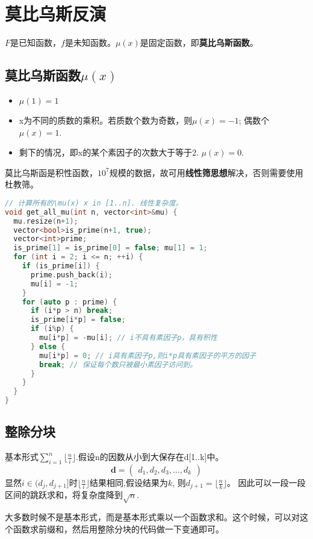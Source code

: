 \section{莫比乌斯反演}
		\par $F$是已知函数，$f$是未知函数。$\mu(x)$是固定函数，即\textbf{莫比乌斯函数}。
		\subsection{莫比乌斯函数$\mu(x)$}
			\begin{itemize}
				\item $\mu(1)=1$
				\item x为不同的质数的乘积。若质数个数为奇数，则$\mu(x)=-1$; 偶数个$\mu(x)=1$.
				\item 剩下的情况，即x的某个素因子的次数大于等于2. $\mu(x)=0$.
			\end{itemize}
			\par 莫比乌斯函是积性函数，$10^7$规模的数据，故可用\textbf{线性筛思想}解决，否则需要使用杜教筛。
			\begin{lstlisting}[language={c++}]
// 计算所有的\mu(x) x in [1..n]. 线性复杂度。
void get_all_mu(int n, vector<int>&mu) {
  mu.resize(n+1);
  vector<bool>is_prime(n+1, true);
  vector<int>prime;
  is_prime[1] = is_prime[0] = false; mu[1] = 1;
  for (int i = 2; i <= n; ++i) {
    if (is_prime[i]) {
      prime.push_back(i);
      mu[i] = -1;
    }
    for (auto p : prime) {
      if (i*p > n) break;
      is_prime[i*p] = false;
      if (i%p) {
        mu[i*p] = -mu[i]; // i不具有素因子p，具有积性
      } else {
        mu[i*p] = 0; // i具有素因子p,则i*p具有素因子的平方的因子
        break; // 保证每个数只被最小素因子访问到。
      }
    }
  }
}
			\end{lstlisting}

		\subsection{整除分块}
		基本形式$\sum\limits_{i=1}^{n} \lfloor \frac{n}{i} \rfloor$.假设n的因数从小到大保存在d[1..k]中。
		\begin{equation}
			\mathbf{d} = 
			\left(
				\begin{array}{ccc}
					d_1, d_2,  d_3,  \ldots,  d_k
				\end{array}	
			\right)
		\end{equation}
		显然$i \in (d_j,d_{j+1}]$时$\lfloor \frac{n}{i} \rfloor$结果相同,假设结果为$k$, 则$d_{j+1}=\lfloor \frac{n}{k} \rfloor$。
		因此可以一段一段区间的跳跃求和，将复杂度降到$\sqrt{n}$.
		\par 大多数时候不是基本形式，而是基本形式乘以一个函数求和。这个时候，可以对这个函数求前缀和，然后用整除分块的代码做一下变通即可。
		
